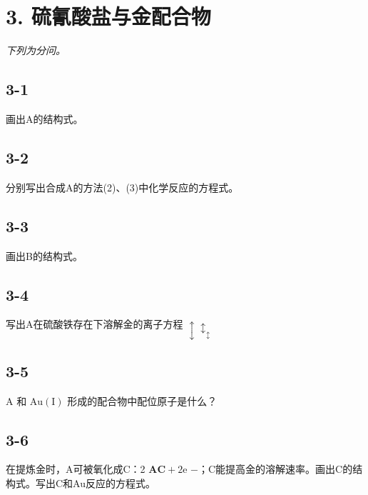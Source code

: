 \section*{3. 硫氰酸盐与金配合物}
\textit{下列为分问。}

\subsection*{3-1}
画出A的结构式。

\subsection*{3-2}
分别写出合成A的⽅法(2)、(3)中化学反应的⽅程式。

\subsection*{3-3}
画出B的结构式。

\subsection*{3-4}
写出A在硫酸铁存在下溶解⾦的离⼦⽅程 $\updownarrow \updownarrow _ { \updownarrow }$

\subsection*{3-5}
A 和 $\mathrm { A u ( I ) }$ 形成的配合物中配位原⼦是什么？

\subsection*{3-6}
在提炼⾦时，A可被氧化成C：2 $\mathbf { A }  \mathbf { C } + 2 { \mathrm e }$ −；C能提⾼⾦的溶解速率。画出C的结构式。写出C和Au反应的⽅程式。
